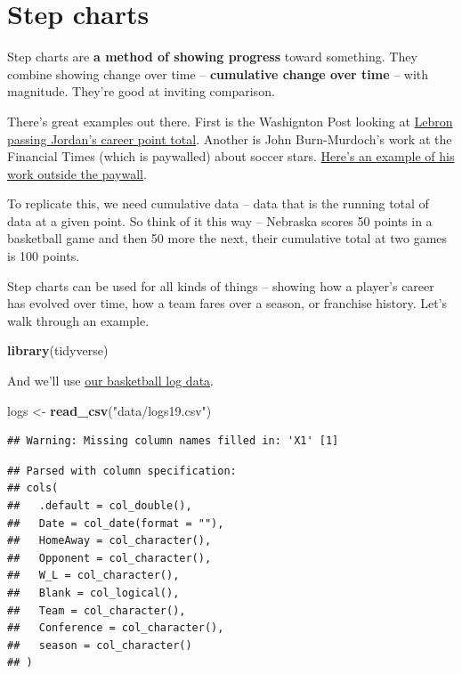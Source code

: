 \documentclass[]{book}
\newenvironment{Shaded}{\begin{snugshade}}{\end{snugshade}}
\newcommand{\KeywordTok}[1]{\textcolor[rgb]{0.13,0.29,0.53}{\textbf{#1}}}
\newcommand{\NormalTok}[1]{#1}
\newcommand{\StringTok}[1]{\textcolor[rgb]{0.31,0.60,0.02}{#1}}
\begin{document}
\hypertarget{step-charts}{%
\chapter{Step charts}\label{step-charts}}

Step charts are \textbf{a method of showing progress} toward something. They combine showing change over time -- \textbf{cumulative change over time} -- with magnitude. They're good at inviting comparison.

There's great examples out there. First is the Washignton Post looking at \href{https://www.washingtonpost.com/graphics/sports/lebron-james-michael-jordan-nba-scoring-list/?utm_term=.481074150849}{Lebron passing Jordan's career point total}. Another is John Burn-Murdoch's work at the Financial Times (which is paywalled) about soccer stars. \href{http://johnburnmurdoch.github.io/projects/goal-lines/CL/}{Here's an example of his work outside the paywall}.

To replicate this, we need cumulative data -- data that is the running total of data at a given point. So think of it this way -- Nebraska scores 50 points in a basketball game and then 50 more the next, their cumulative total at two games is 100 points.

Step charts can be used for all kinds of things -- showing how a player's career has evolved over time, how a team fares over a season, or franchise history. Let's walk through an example.

\begin{Shaded}
\begin{Highlighting}[]
\KeywordTok{library}\NormalTok{(tidyverse)}
\end{Highlighting}
\end{Shaded}

And we'll use \href{https://unl.box.com/s/a8m91bro10t89watsyo13yjegb1fy009}{our basketball log data}.

\begin{Shaded}
\begin{Highlighting}[]
\NormalTok{logs <-}\StringTok{ }\KeywordTok{read_csv}\NormalTok{(}\StringTok{"data/logs19.csv"}\NormalTok{)}
\end{Highlighting}
\end{Shaded}

\begin{verbatim}
## Warning: Missing column names filled in: 'X1' [1]
\end{verbatim}

\begin{verbatim}
## Parsed with column specification:
## cols(
##   .default = col_double(),
##   Date = col_date(format = ""),
##   HomeAway = col_character(),
##   Opponent = col_character(),
##   W_L = col_character(),
##   Blank = col_logical(),
##   Team = col_character(),
##   Conference = col_character(),
##   season = col_character()
## )
\end{verbatim}
\end{document}
